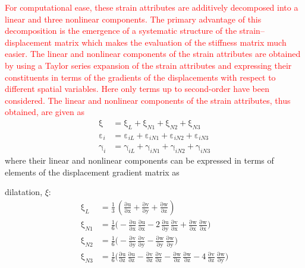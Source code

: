 \textcolor{red}{For computational ease, these strain attributes are additively decomposed into a linear and three nonlinear components. The primary advantage of this decomposition is the emergence of a systematic structure of the strain--displacement matrix which makes the evaluation of the stiffness matrix much easier. The linear and nonlinear components of the strain attributes are obtained by using a Taylor series expansion of the strain attributes and expressing their constituents in terms of the gradients of the displacements with respect to different spatial variables. Here only terms up to second-order have been considered. The linear and nonlinear components of the strain attributes, thus obtained, are given as}
\begin{subequations}
	\begin{align}
	\mathrm  \xi & = \mathrm \xi_{L} + \mathrm  \xi_{N1} + \mathrm  \xi_{N2} + \mathrm  \xi_{N3}\\
	\mathrm  \varepsilon_{i} & = \mathrm  \varepsilon_{iL} + \mathrm  \varepsilon_{iN1} + \mathrm  \varepsilon_{iN2} + \mathrm  \varepsilon_{iN3} \\
	\mathrm \gamma_{i} & = \mathrm  \gamma_{iL} + \mathrm  \gamma_{iN1} + \mathrm  \gamma_{iN2} + \mathrm  \gamma_{iN3}
	\end{align}
	\label{totalvirtualstrain}
\end{subequations}
where their linear and nonlinear components can be expressed in terms of elements of the displacement gradient matrix as

dilatation, $\xi$:
\begin{subequations}
	\begin{align}
	\mathrm \xi_{L} & = \frac{1}{3} \, \left(\mathrm{\frac{\partial u}{\partial x}} + \mathrm{\frac{\partial v}{\partial y}} + \mathrm{\frac{\partial w}{\partial z}}\right)\\
	\mathrm \xi_{N1} & = \frac{1}{6} \Big(-\mathrm{\frac{\partial u}{\partial x}}\, \mathrm{\frac{\partial u}{\partial x}}- 2 \, \mathrm{\frac{\partial u}{\partial y}}\, \mathrm{\frac{\partial v}{\partial x}} + \mathrm{\frac{\partial w}{\partial x}}\, \mathrm{\frac{\partial w}{\partial x}}\Big)\\
	\mathrm \xi_{N2} & = \frac{1}{6}\Big(- \mathrm{\frac{ \partial v}{\partial y}}\, \mathrm{\frac{ \partial v}{\partial y}} - \mathrm{\frac{\partial w}{\partial y}}\, \mathrm{\frac{\partial w}{\partial y}}\Big)\\
	\mathrm \xi_{N3} & = \frac{1}{6}\Big(\mathrm{\frac{\partial u}{\partial z}}\, \mathrm{\frac{\partial u}{\partial z}} - \mathrm{\frac{\partial v}{\partial z}}\, \mathrm{\frac{\partial v}{\partial z}} - \mathrm{\frac{\partial w}{\partial z}}\, \mathrm{\frac{\partial w}{\partial z}}  - 4 \, \mathrm{\frac{\partial v}{\partial z}}\, \mathrm{\frac{\partial w}{\partial y}}\Big)
	\end{align}
\end{subequations}

